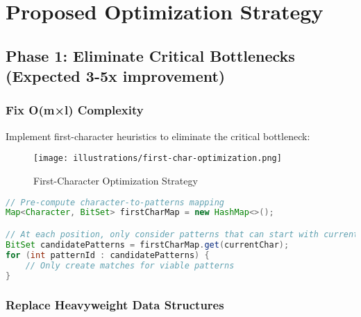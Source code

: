 \documentclass[11pt,a4paper]{article}
\begin{document}
\section{Proposed Optimization Strategy}

\subsection{Phase 1: Eliminate Critical Bottlenecks (Expected 3-5x improvement)}

\subsubsection{Fix O(m×l) Complexity}

Implement first-character heuristics to eliminate the critical bottleneck:

\begin{figure}[htbp]
\centering
\texttt{[image: illustrations/first-char-optimization.png]}
\caption{First-Character Optimization Strategy}
\label{fig:first-char}
\end{figure}

\begin{lstlisting}[language=Java,caption=Proposed first-character optimization]
// Pre-compute character-to-patterns mapping
Map<Character, BitSet> firstCharMap = new HashMap<>();

// At each position, only consider patterns that can start with current char
BitSet candidatePatterns = firstCharMap.get(currentChar);
for (int patternId : candidatePatterns) {
    // Only create matches for viable patterns
}
\end{lstlisting}

\subsubsection{Replace Heavyweight Data Structures}
\end{document}
